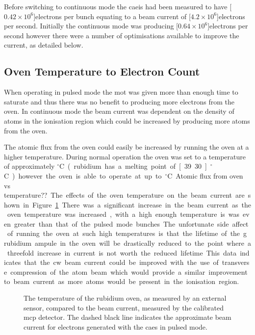 Before switching to continuous mode the \gls{caeis} had been measured to have \unit[$0.42\times10^6$]{electrons per bunch} equating to a beam current of \unit[$4.2\times10^6$]{electrons per second}.
Initially the continuous mode was producing \unit[$0.64\times10^6$]{electrons per second} however there were a number of optimisations available to improve the current, as detailed below.

\subsection{Oven Temperature to Electron Count}
When operating in pulsed mode the \gls{mot} was given more than enough time to saturate and thus there was no benefit to producing more electrons from the oven.
In continuous mode the beam current was dependent on the density of atoms in the ionisation region which could be increased by producing more atoms from the oven.

The atomic flux from the oven could easily be increased by running the oven at a higher temperature.
During normal operation the oven was set to a temperature of approximately \unit[80]{$^\circ$C} (rubidium has a melting point of \unit[39.30]{$^\circ$C}) however the oven is able to operate at up to \unit[200]{$^\circ$C}.

{\color{red}Atomic flux from oven vs temperature??}

The effects of the oven temperature on the beam current are shown in Figure~\ref{figure:oven_counts}.
There was a significant increase in the beam current as the oven temperature was increased, with a high enough temperature is was even greater than that of the pulsed mode bunches.
The unfortunate side affect of running the oven at such high temperatures is that the lifetime of the \unit[5]{g} rubidium ampule in the oven will be drastically reduced to the point where a threefold increase in current is not worth the reduced lifetime.
This data indicates that the \gls{cw} beam current could be improved with the use of transverse compression of the atom beam which would provide a similar improvement to beam current as more atoms would be present in the ionisation region.

\begin{figure}
    \center
    
    \caption{The temperature of the rubidium oven, as measured by an external sensor, compared to the beam current, measured by the calibrated \gls{mcp} detector.
    The dashed black line indicates the approximate beam current for electrons generated with the \gls{caes} in pulsed mode.}
    \label{figure:oven_counts}
\end{figure}

